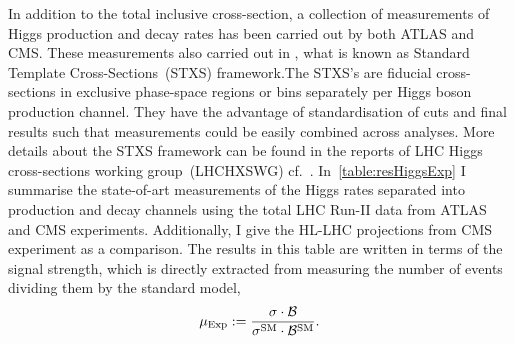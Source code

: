 \par In addition to the total inclusive cross-section, a collection of measurements of Higgs production and decay rates has been carried out by both ATLAS and CMS. These measurements also carried out in , what is known as Standard Template Cross-Sections~(STXS) framework.The STXS's are fiducial cross-sections in exclusive phase-space regions or bins separately per Higgs boson production channel. They have the advantage of standardisation of cuts and final results such that measurements could be easily combined across analyses. More details about the STXS framework can be found in the reports of  LHC Higgs cross-sections working group~(LHCHXSWG) cf.~\cite{Berger:2019wnu}.  In~\autoref{table:resHiggsExp} I summarise the state-of-art measurements of the Higgs rates separated into production and decay channels using the total LHC Run-II data from ATLAS and CMS experiments. Additionally, I give the HL-LHC projections from CMS experiment as a comparison. The results in this table are written in terms of the signal strength, which is directly extracted from measuring the number of events dividing them by the standard model,
\begin{equation}
	\mu_{\mathrm{Exp}} := \frac{ \sigma \cdot \mathcal{B}}{ \sigma^{\mathrm{SM}} \cdot \mathcal{B}^{\mathrm{SM}}}.
\end{equation}
\newpage
\begingroup
 
\endgroup
\FloatBarrier
